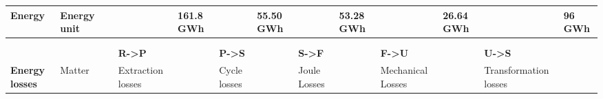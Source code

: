 \begin{table}[]
{\begin{tabular}{|lllllllllllll|}
\multicolumn{1}{|l|}{\textbf{Energy}}   & \multicolumn{1}{l|}{Energy unit}      & \multicolumn{1}{l|}{}            & \multicolumn{1}{l|}{}                  & \multicolumn{1}{l|}{161.8 GWh}       & \multicolumn{1}{l|}{}             & \multicolumn{1}{l|}{55.50 GWh}       & \multicolumn{1}{l|}{}             & \multicolumn{1}{l|}{53.28 GWh}       & \multicolumn{1}{l|}{}                         & \multicolumn{1}{l|}{26.64 GWh}         & \multicolumn{1}{l|}{}                      & 96 GWh           \\ \hline
\multicolumn{13}{|l|}{}                                                                                                                                                                                                                                                                                                                                                                                                                                                                                           \\ \hline
\multicolumn{13}{|l|}{}                                                                                                                                                                                                                                                                                                                                                                                                                                                                                           \\ \hline
                                        &                                       &                                  & \textbf{R-\textgreater{}P}             &                                      & \textbf{P-\textgreater{}S}        &                                      & \textbf{S-\textgreater{}F}        &                                      & \textbf{F-\textgreater{}U}                    &                                        & \textbf{U-\textgreater{}S}                 &                  \\ \hline
\textbf{Energy losses}                  & Matter                                & \multicolumn{1}{l|}{}            & \multicolumn{1}{l|}{Extraction losses} & \multicolumn{1}{l|}{}                & \multicolumn{1}{l|}{Cycle losses} & \multicolumn{1}{l|}{}                & \multicolumn{1}{l|}{Joule Losses} & \multicolumn{1}{l|}{}                & \multicolumn{1}{l|}{Mechanical Losses}        & \multicolumn{1}{l|}{}                  & \multicolumn{1}{l|}{Transformation losses} &                  \\ \hline

\end{tabular}}
\end{table}
